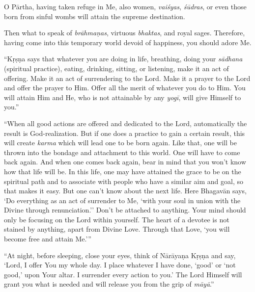 {O Pārtha, having taken refuge in Me, also women, \textit{vaiśyas}, \textit{śūdras}, or even those born from sinful wombs will attain the supreme destination.}

{Then what to speak of \textit{brāhmaṇas}, virtuous \textit{bhaktas}, and royal sages. Therefore, having come into this temporary world devoid of happiness, you should adore Me.}

\enquote{Kṛṣṇa says that whatever you are doing in life, breathing, doing your \textit{sādhana} (spiritual practice), eating, drinking, sitting, or listening, make it an act of offering. Make it an act of surrendering to the Lord. Make it a prayer to the Lord and offer the prayer to Him. Offer all the merit of whatever you do to Him. You will attain Him and He, who is not attainable by any \textit{yogī}, will give Himself to you.}

\enquote{When all good actions are offered and dedicated to the Lord, automatically the result is God-realization. But if one does a practice to gain a certain result, this will create \textit{karma} which will lead one to be born again. Like that, one will be thrown into the bondage and attachment to this world. One will have to come back again. And when one comes back again, bear in mind that you won’t know how that life will be. In this life, one may have attained the grace to be on the spiritual path and to associate with people who have a similar aim and goal, so that makes it easy. But one can’t know about the next life. Here Bhagavān says, \enquote{Do everything as an act of surrender to Me, ‘with your soul in union with the Divine through renunciation.’} Don’t be attached to anything. Your mind should only be focusing on the Lord within yourself. The heart of a devotee is not stained by anything, apart from Divine Love. Through that Love, \enquote{you will become free and attain Me.}}

\enquote{At night, before sleeping, close your eyes, think of Nārāyaṇa Kṛṣṇa and say, \enquote{Lord, I offer You my whole day. I place whatever I have done, ‘good’ or ‘not good,’ upon Your altar. I surrender every action to you.} The Lord Himself will grant you what is needed and will release you from the grip of \textit{māyā}.}

